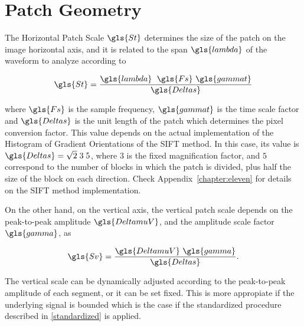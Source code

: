 \section{Patch Geometry}
\label{patchgeometry}


The Horizontal Patch Scale $\gls{St}$ determines the size of the patch on the image horizontal axis, and it is related to the span $\gls{lambda}$ of the waveform to analyze according to

\begin{equation}
\gls{St} = \frac{ \gls{lambda} \;  \  \gls{Fs} \ \gls{gammat} }{\gls{Deltas}}
\label{eq:horizontalpatchscale}
\end{equation}

\noindent where $\gls{Fs}$ is the sample frequency, $\gls{gammat}$ is the time scale factor and $\gls{Deltas}$ is the unit length of the patch which determines the pixel conversion factor.  This value depends on the actual implementation of the Histogram of Gradient Orientations of the SIFT method. In this case, its value is $\gls{Deltas} = \sqrt{2} \; 3 \; 5$, where $3$ is the fixed magnification factor, and $5$ correspond to the number of blocks in which the patch is divided, plus half the size of the block on each direction.  Check Appendix~\ref{chapter:eleven} for details on the SIFT method implementation.

On the other hand, on the vertical axis, the vertical patch scale depends on the peak-to-peak amplitude $\gls{DeltamuV}$, and the amplitude scale factor $\gls{gamma}$, as

\begin{equation}
\gls{Sv} = \frac{\gls{DeltamuV} \ \gls{gamma}}{\gls{Deltas}}.
\label{eq:verticalpatchscale}
\end{equation}

The vertical scale can be dynamically adjusted according to the peak-to-peak amplitude of each segment, or it can be set fixed.  This is more appropiate if the underlying signal is bounded which is the case if the standardized procedure described in \ref{standardized} is applied.

